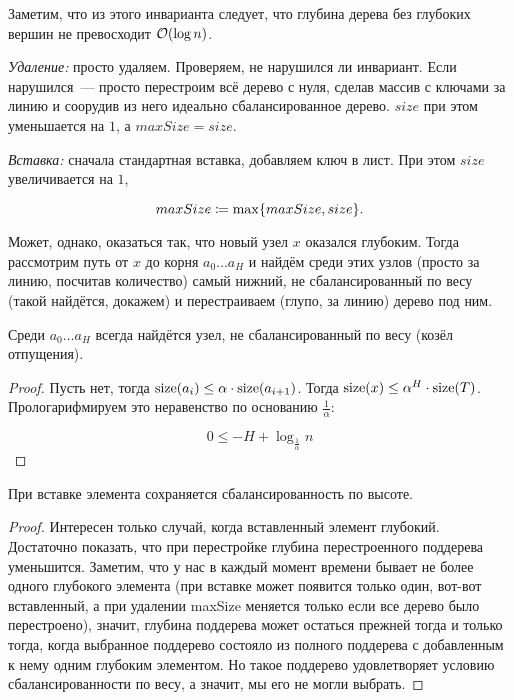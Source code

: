 Заметим, что из этого инварианта следует, что глубина дерева без глубоких вершин не превосходит $\mathcal{O}(\log n)$.

{\it Удаление:} просто удаляем. Проверяем, не нарушился ли инвариант. Если нарушился~--- просто перестроим всё дерево с нуля, сделав массив с ключами за линию и соорудив из него идеально сбалансированное дерево. $size$ при этом уменьшается на $1$, а $maxSize = size$.

{\it Вставка:} сначала стандартная вставка, добавляем ключ в лист. При этом $size$ увеличивается на $1$,

\begin{equation*}
	maxSize \coloneqq \max \set*{maxSize,size}.
\end{equation*}

Может, однако, оказаться так, что новый узел $x$ оказался глубоким. Тогда рассмотрим путь от $x$ до корня $a_0 \ldots a_{H}$ и найдём среди этих узлов (просто за линию, посчитав количество) самый нижний, не сбалансированный по весу (такой найдётся, докажем) и перестраиваем (глупо, за линию) дерево под ним.

\begin{theorem}
	Среди $a_0 \ldots a_{H}$ всегда найдётся узел, не сбалансированный по весу (козёл отпущения).
\end{theorem}

\begin{proof}
	Пусть нет, тогда $\operatorname{size} (a_i) \le \alpha \cdot \operatorname{size} (a_{i+1})$. Тогда $\operatorname{size} (x) \le \alpha^H \cdot \operatorname{size} (T)$. Прологарифмируем это неравенство по основанию $\frac{1}{\alpha}$:

	\begin{equation*}
		0 \le -H + \log_{\frac{1}{\alpha}} n
	\end{equation*}
\end{proof}

\begin{theorem}
	При вставке элемента сохраняется сбалансированность по высоте.
\end{theorem}
\begin{proof}
	Интересен только случай, когда вставленный элемент глубокий. Достаточно показать, что при перестройке глубина перестроенного поддерева уменьшится. Заметим, что у нас в каждый момент времени бывает не более одного глубокого элемента (при вставке может появится только один, вот-вот вставленный, а при удалении maxSize меняется только если все дерево было перестроено), значит, глубина поддерева может остаться прежней тогда и только тогда, когда выбранное поддерево состояло из полного поддерева с добавленным к нему одним глубоким элементом. Но такое поддерево удовлетворяет условию сбалансированности по весу, а значит, мы его не могли выбрать.
\end{proof}

